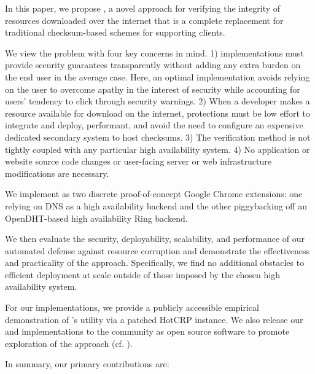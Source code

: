In this paper, we propose \SYSTEM{}, a novel approach for verifying the
integrity of resources downloaded over the internet that is a complete
replacement for traditional checksum-based schemes for supporting clients.

We view the problem with four key concerns in mind. 1) \SYSTEM{} implementations
must provide security guarantees transparently without adding any extra burden
on the end user in the average case. Here, an optimal implementation avoids
relying on the user to overcome apathy in the interest of security while
accounting for users' tendency to click through security warnings. 2) When a
developer makes a resource available for download on the internet, \SYSTEM{}
protections must be low effort to integrate and deploy, performant, and avoid
the need to configure an expensive dedicated secondary system to host checksums.
3) The verification method is not tightly coupled with any particular high
availability system. 4) No application or website source code changes or
user-facing server or web infrastructure modifications are necessary.

We implement \SYSTEM{} as two discrete proof-of-concept Google Chrome
extensions: one relying on DNS as a high availability backend and the other
piggybacking off an OpenDHT-based high availability Ring backend.

We then evaluate the security, deployability, scalability, and performance of
our automated defense against resource corruption and demonstrate the
effectiveness and practicality of the \SYSTEM{} approach. Specifically, we find
no additional obstacles to efficient deployment at scale outside of those
imposed by the chosen high availability system.

For our implementations, we provide a publicly accessible empirical
demonstration of \SYSTEM{}'s utility via a patched HotCRP instance. We also
release our \DNSSYS{} and \DHTSYS{} implementations to the community as open
source software to promote exploration of the \SYSTEM{} approach (cf.
).

In summary, our primary contributions are: 

